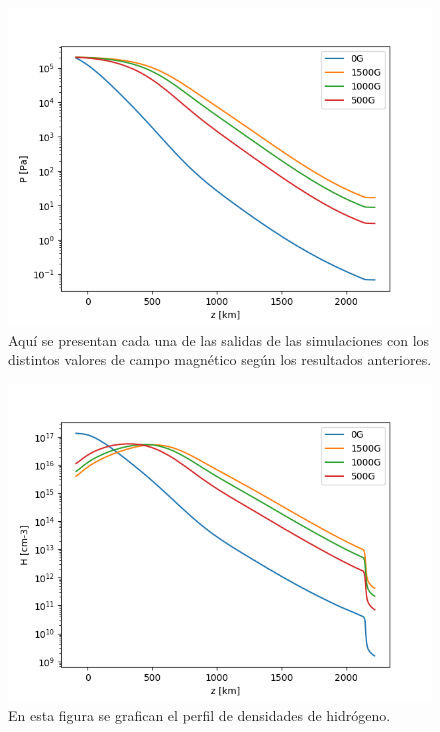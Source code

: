 \documentclass[9pt]{book}
\begin{document}
\begin{figure}[h]
\centering
\includegraphics[scale=1]{fe_Presion}
\caption{ Aqu\'i se presentan cada una de las salidas de las simulaciones con los distintos valores de campo magn\'etico seg\'un los resultados anteriores.}
\end{figure}

\begin{figure}[h]
\centering
\includegraphics[scale=1]{fe_perfil_de_densidades}
\caption{ En esta figura se grafican el perfil de densidades de hidr\'ogeno.}
\label{am_perfil_de_densidades}
\label{fe_perfil_de_densidades}
\end{figure}
\end{document}

